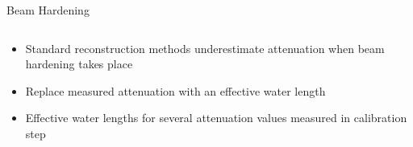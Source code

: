 \begin{frame}[c]{Beam Hardening}
        \vspace{-0.5cm}
    \begin{columns}[c, onlytextwidth]
        \begin{column}{0.6\textwidth}

            \begin{itemize}
                \item Standard reconstruction methods underestimate attenuation when beam hardening takes place
            \end{itemize}

            \vspace{1.0cm}

            \begin{itemize}
                \setlength\itemsep{0.3cm}
                \item Replace measured attenuation with an effective water length
                \item Effective water lengths for several attenuation values measured in calibration step


\end{itemize}
\end{column}
\end{columns}
\end{frame}
